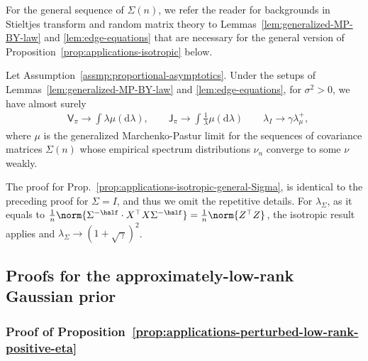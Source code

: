 \documentclass[11pt]{article}
\newcommand{\de}{\mathrm{d}}
\newcommand{\jfunc}{\mathsf{J}}
\begin{document}
For the general sequence of $\Sigma(n)$, we refer the reader for backgrounds in Stieltjes transform and random matrix theory to Lemmas~\ref{lem:generalized-MP-BY-law} and \ref{lem:edge-equations} that are necessary for the general version of Proposition~\ref{prop:applications-isotropic} below.

\begin{proposition} \label{prop:applications-isotropic-general-Sigma} Let Assumption~\ref{assmp:proportional-asymptotics}. Under the setups of Lemmas~\ref{lem:generalized-MP-BY-law} and \ref{lem:edge-equations}, for $\sigma^2 > 0$, we have almost surely
\begin{align*}
    &\mathsf{V}_{\pi} \to \int \lambda \mu(\de \lambda), \qquad \jfunc_{\pi} \to \int \frac{1}{\lambda} \mu(\de \lambda) \qquad \lambda_{I} \to \gamma \lambda_\mu^+,
\end{align*}
where $\mu$ is the generalized Marchenko-Pastur limit for the sequences of covariance matrices $\Sigma(n)$ whose empirical spectrum distributions $\nu_n$ converge to some $\nu$ weakly.
\end{proposition}
The proof for Prop.~\ref{prop:applications-isotropic-general-Sigma}, is identical to the preceding proof for $\Sigma = I$, and thus we omit the repetitive details. For $\lambda_\Sigma$, as it equals to $\frac{1}{n} \norm{\Sigma^{-\half} \cdot X^\top X \Sigma^{-\half}} = \frac{1}{n} \norm{Z^\top Z}$, the isotropic result applies and $\lambda_\Sigma \to (1+\sqrt{\gamma})^2$.

\subsection{Proofs for the approximately-low-rank Gaussian prior} \label{proof:applications-perturbed-low-rank}

\subsubsection{Proof of Proposition~\ref{prop:applications-perturbed-low-rank-positive-eta}} \label{proof:applications-perturbed-low-rank-positive-eta}
\end{document}
